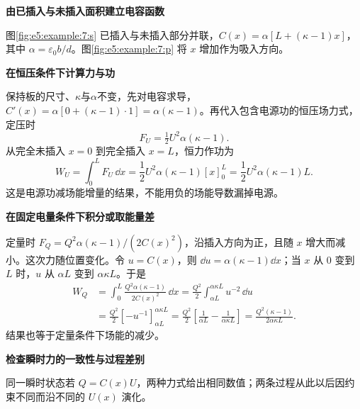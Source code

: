 \begin{solution}\textbf{由已插入与未插入面积建立电容函数}\par\nobreak
图\ref{fig:e5:example:7:s} 已插入与未插入部分并联，$C(x)=\alpha[L+(\kappa-1)x]$，其中 $\alpha=\varepsilon_0b/d$。图\ref{fig:e5:example:7:p} 将 $x$ 增加作为吸入方向。

\par\medskip{}\noindent\textbf{在恒压条件下计算力与功}\par\nobreak
保持板的尺寸、$\kappa$与$\alpha$不变，先对电容求导，$C'(x)=\alpha[0+(\kappa-1)\cdot1]=\alpha(\kappa-1)$。再代入包含电源功的恒压场力式，定压时
\[
 F_U=\tfrac12U^2\alpha(\kappa-1).
\]
从完全未插入 $x=0$ 到完全插入 $x=L$，恒力作功为
\[
W_U=\int_0^L F_U\,\dd x
=\frac12U^2\alpha(\kappa-1)[x]_0^L
=\frac12U^2\alpha(\kappa-1)L.
\]
这是电源功减场能增量的结果，不能用负的场能导数漏掉电源。



\par\medskip{}\noindent\textbf{在固定电量条件下积分或取能量差}\par\nobreak
定量时 $F_Q=Q^2\alpha(\kappa-1)/(2C(x)^2)$，沿插入方向为正，且随 $x$ 增大而减小。这次力随位置变化。令 $u=C(x)$，则 $\dd u=\alpha(\kappa-1)\dd x$；当 $x$ 从 $0$ 变到 $L$ 时，$u$ 从 $\alpha L$ 变到 $\alpha\kappa L$。于是
\begin{align*}
W_Q&=\int_0^L\frac{Q^2\alpha(\kappa-1)}{2C(x)^2}\,\dd x
=\frac{Q^2}{2}\int_{\alpha L}^{\alpha\kappa L}u^{-2}\,\dd u\\
&=\frac{Q^2}{2}[-u^{-1}]_{\alpha L}^{\alpha\kappa L}
=\frac{Q^2}2\left[\frac1{\alpha L}-\frac1{\alpha\kappa L}\right]
=\frac{Q^2(\kappa-1)}{2\alpha\kappa L}.
\end{align*}
结果也等于定量条件下场能的减少。


\par\medskip{}\noindent\textbf{检查瞬时力的一致性与过程差别}\par\nobreak
同一瞬时状态若 $Q=C(x)U$，两种力式给出相同数值；两条过程从此以后因约束不同而沿不同的 $U(x)$ 演化。\end{solution}

